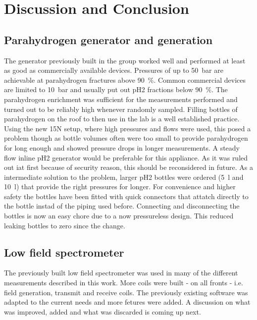 \chapter{Discussion and Conclusion}
    \label{chap:conclusion}
    \section{Parahydrogen generator and generation}
        The generator previously built in the group worked well and performed at least as good as commercially available devices. Pressures of up to \SI{50}{\bar} are achievable at parahydrogen fractures above \SI{90}{\%}. Common commercial devices are limited to \SI{10}{\bar} and usually put out pH2 fractions below \SI{90}{\%}. The parahydrogen enrichment was sufficient for the measurements performed and turned out to be reliably high whenever randomly sampled.
        Filling bottles of parahydrogen on the roof to then use in the lab is a well established practice. Using the new 15N setup, where high pressures and flows were used, this posed a problem though as bottle volumes often were too small to provide parahydrogen for long enough and showed pressure drops in longer measurements. A steady flow inline pH2 generator would be preferable for this appliance. As it was ruled out iat first because of security reason, this should be reconsidered in future. As a intermediate solution to the problem, larger pH2 bottles were ordered (\SI{5}{\l} and \SI{10}{\l}) that provide the right pressures for longer. For convenience and higher safety the bottles have been fitted with quick connectors that attatch directly to the bottle instad of the piping used before. Connecting and disconnecting the bottles is now an easy chore due to a now pressureless design. This reduced leaking bottles to zero since the change.
    \section{Low field spectrometer}
        The previously built low field spectrometer was used in many of the different measurements described in this work. More coils were built - on all fronts - i.e. field generation, transmit and receive coils. The previously existing software was adapted to the current needs and more fetures were added. A discussion on what was improved, added and  what was discarded is coming up next.
